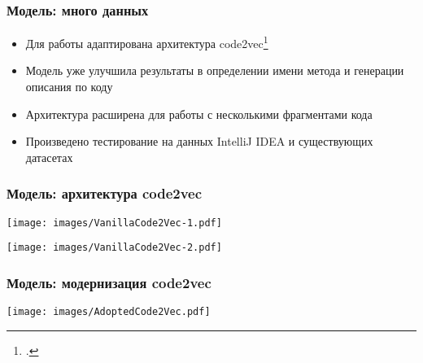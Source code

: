 \documentclass[xcolor=table]{beamer}
\begin{document}
\begin{frame}
	\frametitle{Модель: много данных}
	\begin{itemize}
		\item Для работы адаптирована архитектура code2vec\footcite{alon2018code2vec}
		\item Модель уже улучшила результаты в определении имени метода и генерации описания по коду
		\item Архитектура расширена для работы с несколькими фрагментами кода
		\item Произведено тестирование на данных IntelliJ IDEA и существующих датасетах
	\end{itemize}
\begin{table}[]
	\centering
	\end{table}
\end{frame}

\begin{frame}
	\frametitle{Модель: архитектура code2vec}
	\begin{center}
		\texttt{[image: images/VanillaCode2Vec-1.pdf]}
	\end{center}
	\begin{center}
		\texttt{[image: images/VanillaCode2Vec-2.pdf]}
	\end{center}
\end{frame}

\begin{frame}
	\frametitle{Модель: модернизация code2vec}
	\begin{center}
		\texttt{[image: images/AdoptedCode2Vec.pdf]}
	\end{center}
\end{frame}
\end{document}
